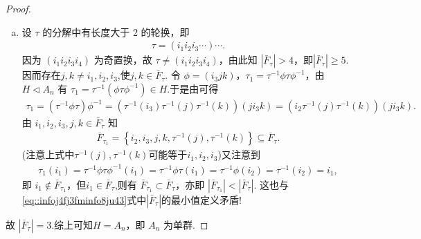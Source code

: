 \documentclass[../../main.tex]{subfiles}%
\begin{document}
\begin{proof}
\begin{enumerate}[(a)]
若 \( j \in \bar{F}_\tau \)，则$\tau =(i_1i_2)\left( i_3i_4 \right) \cdots \left( j\tau ^{-1}\left( j \right) \right) \cdots $且$i_1,i_2,i_3,i_4,j,\tau ^{-1}\left( j \right) $互不相同.由 \( j \neq i_1, i_2, i_3, i_4 \)知$|\bar{F}_\tau| \geqslant 5$,又$\tau$可写成对换之积,故$|\bar{F}_\tau|$必为偶数,因此 \( |\bar{F}_\tau| \geqslant 6 \). 此时由可得
\begin{align*}
(i_4i_3\tau ^{-1}(j))(i_4i_3j)=\left( i_4\tau ^{-1}\left( j \right) \right) \left( i_4i_3 \right) \left( i_4i_3j \right) =\left( i_4\tau ^{-1}\left( j \right) \right) \left( i_4 \right) \left( i_3j \right) =\left( i_4\tau ^{-1}\left( j \right) \right) \left( i_3j \right) .
\end{align*}
于是
\begin{align*}
|\bar{F}_{\tau_1}| = |\{i_3, i_4, j, \tau^{-1}(j)\}| = 4 < |\bar{F}_\tau|.
\end{align*}
这也\eqref{eq::infoj4fj3fminfo8ju43}式中$|\bar{F}_\tau|$的最小值定义矛盾! 因而 \( \tau = (i_1i_2)(i_3i_4)\cdots \) 是不可能的.
\item 设 \( \tau \) 的分解中有长度大于 2 的轮换，即
\begin{align*}
\tau = (i_1i_2i_3\cdots)\cdots.
\end{align*}
因为 \( (i_1i_2i_3i_4) \) 为奇置换，故 \( \tau \neq (i_1i_2i_3i_4) \)，由此知 \( |\bar{F}_\tau| > 4 \)，即$|\bar{F}_\tau|\geqslant 5$.因而存在\( j, k\neq i_1,i_2,i_3\),使\(j,k \in \bar{F}_\tau \). 令 \( \phi = (i_3jk) \)，\( \tau_1 = \tau^{-1}\phi\tau\phi^{-1} \)，由 \( H \lhd A_n \) 有 \( \tau_1 = \tau^{-1}(\phi\tau\phi^{-1}) \in H \).于是由可得
\begin{align*}
\tau _1=(\tau ^{-1}\phi \tau )\phi ^{-1}=(\tau ^{-1}(i_3)\tau ^{-1}(j)\tau ^{-1}(k))(ji_3k)=(i_2\tau ^{-1}(j)\tau ^{-1}(k))(ji_3k).
\end{align*}
由 \(i_1,i_2,i_3, j, k \in \bar{F}_\tau \) 知
\begin{align*}
\bar{F}_{\tau _1} = \left\{ i_2,i_3,j,k,\tau ^{-1}(j),\tau ^{-1}(k) \right\} \subseteq \bar{F}_{\tau}.
\end{align*}
(注意上式中$\tau^{-1}(j),\tau^{-1}(k)$可能等于$i_1,i_2,i_3$)又注意到
\begin{align*}
\tau _1(i_1)=\tau ^{-1}\phi \tau \phi ^{-1}(i_1)=\tau ^{-1}\phi \tau (i_1)=\tau ^{-1}\phi (i_2)=\tau ^{-1}(i_2)=i_1,
\end{align*}
即 \( i_1 \notin \bar{F}_{\tau_1} \)，但$i_1\in \bar{F}_{\tau}$,则有 \( \bar{F}_{\tau_1} \subset \bar{F}_\tau \)，亦即 \( |\bar{F}_{\tau_1}| < |\bar{F}_\tau| \). 这也与\eqref{eq::infoj4fj3fminfo8ju43}式中$|\bar{F}_\tau|$的最小值定义矛盾! 
\end{enumerate}
故 \( |\bar{F}_\tau| = 3 \).综上可知\( H = A_n \)，即 \( A_n \) 为单群.

\end{proof}
\end{document}
